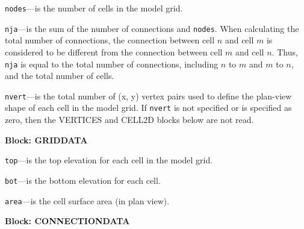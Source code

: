 \begin{description}
\item \texttt{nodes}---is the number of cells in the model grid.

\item \texttt{nja}---is the sum of the number of connections and \texttt{nodes}.  When calculating the total number of connections, the connection between cell $n$ and cell $m$ is considered to be different from the connection between cell $m$ and cell $n$.  Thus, \texttt{nja} is equal to the total number of connections, including $n$ to $m$ and $m$ to $n$, and the total number of cells.

\item \texttt{nvert}---is the total number of (x, y) vertex pairs used to define the plan-view shape of each cell in the model grid.  If \texttt{nvert} is not specified or is specified as zero, then the VERTICES and CELL2D blocks below are not read.

\end{description}
\item \textbf{Block: GRIDDATA}

\begin{description}
\item \texttt{top}---is the top elevation for each cell in the model grid.

\item \texttt{bot}---is the bottom elevation for each cell.

\item \texttt{area}---is the cell surface area (in plan view).

\end{description}
\item \textbf{Block: CONNECTIONDATA}

